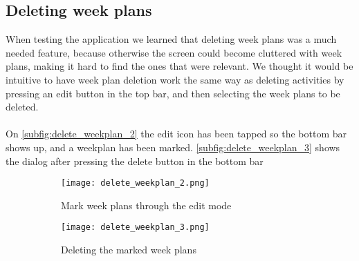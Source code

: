 \subsection{Deleting week plans}
When testing the application we learned that deleting week plans was a much needed feature, because otherwise the screen could become cluttered with week plans, making it hard to find the ones that were relevant.
We thought it would be intuitive to have week plan deletion work the same way as deleting activities by pressing an edit button in the top bar, and then selecting the week plans to be deleted.
\\\\
On \autoref{subfig:delete_weekplan_2} the edit icon has been tapped so the bottom bar shows up, and a weekplan has been marked. \autoref{subfig:delete_weekplan_3} shows the dialog after pressing the delete button in the bottom bar
\begin{figure}[H]
    \begin{subfigure}{0.5\textwidth}
    \texttt{[image: delete\_weekplan\_2.png]}
    \caption{Mark week plans through the edit mode}
    \label{subfig:delete_weekplan_2}
    \end{subfigure}
    \begin{subfigure}{0.5\textwidth}
        \texttt{[image: delete\_weekplan\_3.png]}
    \caption{Deleting the marked week plans}
    \label{subfig:delete_weekplan_3}
    \end{subfigure} 
    \caption{}
    \label{fig:delete_weekplan}
\end{figure}